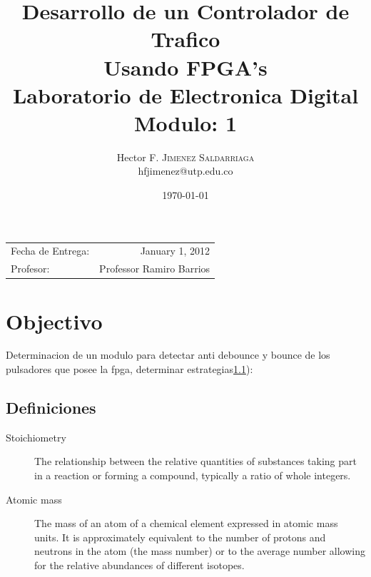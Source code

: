 \documentclass{article}
\title{Desarrollo de un Controlador de Trafico\\ Usando FPGA's \\ Laboratorio de Electronica Digital\\Modulo: 1} %
\author{Hector F. \textsc{Jimenez Saldarriaga}\\ hfjimenez@utp.edu.co} %
\date{\today}                           %
\begin{document}
\maketitle                              %
\begin{center}
\begin{tabular}{l r}
Fecha de Entrega: & January 1, 2012 \\
Profesor: & Professor Ramiro Barrios
\end{tabular}
\end{center}
\section{Objectivo}
Determinacion de un modulo para detectar anti debounce  y bounce de los pulsadores que posee la fpga,
determinar estrategias\ref{definitions}):
\begin{center}\end{center}

\subsection{Definiciones}
\label{definitions}
\begin{description}
\item[Stoichiometry]
The relationship between the relative quantities of substances taking part in a reaction or forming a compound, typically a ratio of whole integers.
\item[Atomic mass]
The mass of an atom of a chemical element expressed in atomic mass units. It is approximately equivalent to the number of protons and neutrons in the atom (the mass number) or to the average number allowing for the relative abundances of different isotopes.
\end{description}
\end{document}
